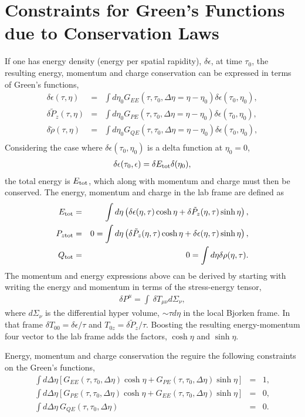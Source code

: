 \documentclass[12pt]{article}
\numberwithin{equation}{section}
\numberwithin{figure}{section}
\begin{document}
\section{Constraints for Green's Functions due to Conservation Laws}
If one has energy density (energy per spatial rapidity), $\delta\epsilon$, at time $\tau_0$, the resulting energy, momentum and charge conservation can be expressed in terms of Green's functions,
\begin{eqnarray}
\delta\epsilon(\tau,\eta)&=&\int d\eta_0 G_{EE}(\tau,\tau_0,\Delta\eta=\eta-\eta_0)\delta\epsilon(\tau_0,\eta_0),\\
\nonumber
\delta \tilde{P}_z(\tau,\eta)&=&\int d\eta_0 G_{PE}(\tau,\tau_0,\Delta\eta=\eta-\eta_0)\delta\epsilon(\tau_0,\eta_0),\\
\nonumber
\delta \tilde{\rho}(\tau,\eta)&=&\int d\eta_0 G_{QE}(\tau,\tau_0,\Delta\eta=\eta-\eta_0)\delta\epsilon(\tau_0,\eta_0),\\
\end{eqnarray}
Considering the case where $\delta\epsilon(\tau_0,\eta_0)$ is a delta function at $\eta_0=0$,
\begin{eqnarray}
\delta\epsilon(\tau_0,\epsilon)=\delta E_{\rm tot}\delta(\eta_0),
\end{eqnarray}
the total energy is $E_{\rm tot}$, which along with momentum and charge must then be conserved. The energy, momentum and charge in the lab frame are defined as
\begin{eqnarray}
E_{\rm tot}&=&\int d\eta\left(\delta\epsilon(\eta,\tau)\cosh\eta+\delta\tilde{P}_z(\eta,\tau)\sinh\eta\right),\\
P_{z{\rm tot}}&=&0=\int d\eta\left(\delta\tilde{P}_z(\eta,\tau)\cosh\eta+\delta\epsilon(\eta,\tau)\sinh\eta\right),\\
Q_{\rm tot}&=&0=\int d\eta\delta\rho(\eta,\tau).
\end{eqnarray}
The momentum and energy expressions above can be derived by starting with writing the energy and momentum in terms of the stress-energy tensor,
\begin{eqnarray}
\delta P^\mu=\int ~\delta T_{\mu\nu}d\Sigma_\nu,
\end{eqnarray}
where $d\Sigma_\nu$ is the differential hyper volume, $\sim \tau d\eta$ in the local Bjorken frame. In that frame $\delta T_{00}=\delta\epsilon/\tau$ and $T_{0z}=\delta \tilde{P}_z/\tau$. Boosting the resulting energy-momentum four vector to the lab frame adds the factors, $\cosh\eta$ and $\sinh\eta$. 

Energy, momentum and charge conservation the reguire the following constraints on the Green's functions,
\begin{eqnarray}\label{eq:sumruleGE}
\int d\Delta\eta\left[G_{EE}(\tau,\tau_0,\Delta\eta)\cosh\eta+G_{PE}(\tau,\tau_0,\Delta\eta)\sinh\eta\right]&=&1,\\
\nonumber
\int d\Delta\eta\left[G_{PE}(\tau,\tau_0,\Delta\eta)\cosh\eta+G_{EE}(\tau,\tau_0,\Delta\eta)\sinh\eta\right]&=&0,\\
\nonumber
\int d\Delta\eta~G_{QE}(\tau,\tau_0,\Delta\eta)&=&0.
\end{eqnarray}
\end{document}
